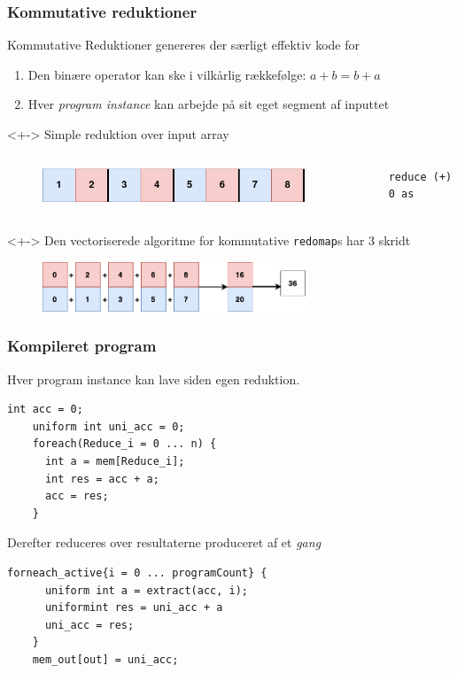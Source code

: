 \documentclass[t]{beamer}
\begin{document}
\begin{frame}[fragile]
  \frametitle{Kommutative reduktioner}
  \begin{block}{Kommutative Reduktioner genereres der særligt effektiv kode for}
  \begin{enumerate}
    \item Den binære operator kan ske i vilkårlig rækkefølge: $a + b = b + a$
    \item Hver \textit{program instance} kan arbejde på sit eget segment af inputtet
  \end{enumerate}
\end{block}
\begin{onlyenv}<+->
  Simple reduktion over input array
  \begin{columns}
  \begin{figure}[H]
  \centering
  \includegraphics[width=0.9\textwidth]{imgs/input.png}
\end{figure}

  \begin{lstlisting}[language=futhark]
    reduce (+) 0 as
  \end{lstlisting}

\end{columns}
\end{onlyenv}
\begin{onlyenv}<+->
  Den vectoriserede algoritme for kommutative \texttt{redomap}s har 3 skridt
  \begin{figure}[h!]
    \centering
    \includegraphics[width=0.7\textwidth]{imgs/kom_reduction.png}
  \end{figure}
\end{onlyenv}
\end{frame}
\begin{frame}[fragile]
  \frametitle{Kompileret program}
  Hver program instance kan lave siden egen reduktion.
  \begin{lstlisting}[language=ispc]
    int acc = 0;
    uniform int uni_acc = 0;
    foreach(Reduce_i = 0 ... n) {
      int a = mem[Reduce_i];
      int res = acc + a;
      acc = res;
    }
  \end{lstlisting}
  Derefter reduceres over resultaterne produceret af et \textit{gang}
  \begin{lstlisting}[language=ispc]
    forneach_active{i = 0 ... programCount} {
      uniform int a = extract(acc, i);
      uniformint res = uni_acc + a
      uni_acc = res;
    }
    mem_out[out] = uni_acc;
  \end{lstlisting}

\end{frame}
\end{document}
